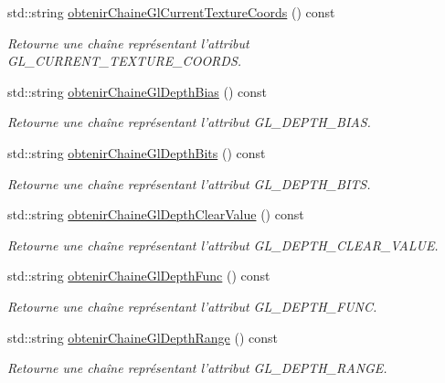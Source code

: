 \begin{DoxyCompactItemize}
std\-::string \hyperlink{group__utilitaire_ga5bf6abadfe9d63e576d34c94c93ee8f0}{obtenir\-Chaine\-Gl\-Current\-Texture\-Coords} () const 
\begin{DoxyCompactList}\small\item\em Retourne une chaîne représentant l'attribut G\-L\-\_\-\-C\-U\-R\-R\-E\-N\-T\-\_\-\-T\-E\-X\-T\-U\-R\-E\-\_\-\-C\-O\-O\-R\-D\-S. \end{DoxyCompactList}\item 
std\-::string \hyperlink{group__utilitaire_gae3e587b7e9f860f3874823a3c4ab7d71}{obtenir\-Chaine\-Gl\-Depth\-Bias} () const 
\begin{DoxyCompactList}\small\item\em Retourne une chaîne représentant l'attribut G\-L\-\_\-\-D\-E\-P\-T\-H\-\_\-\-B\-I\-A\-S. \end{DoxyCompactList}\item 
std\-::string \hyperlink{group__utilitaire_gae1dffc44c8e27d7cb249064cfe35653e}{obtenir\-Chaine\-Gl\-Depth\-Bits} () const 
\begin{DoxyCompactList}\small\item\em Retourne une chaîne représentant l'attribut G\-L\-\_\-\-D\-E\-P\-T\-H\-\_\-\-B\-I\-T\-S. \end{DoxyCompactList}\item 
std\-::string \hyperlink{group__utilitaire_gad8b3e2701fb07b0178b5015868818509}{obtenir\-Chaine\-Gl\-Depth\-Clear\-Value} () const 
\begin{DoxyCompactList}\small\item\em Retourne une chaîne représentant l'attribut G\-L\-\_\-\-D\-E\-P\-T\-H\-\_\-\-C\-L\-E\-A\-R\-\_\-\-V\-A\-L\-U\-E. \end{DoxyCompactList}\item 
std\-::string \hyperlink{group__utilitaire_gac0dff9e4aee8f969fe6e688bb407dcc9}{obtenir\-Chaine\-Gl\-Depth\-Func} () const 
\begin{DoxyCompactList}\small\item\em Retourne une chaîne représentant l'attribut G\-L\-\_\-\-D\-E\-P\-T\-H\-\_\-\-F\-U\-N\-C. \end{DoxyCompactList}\item 
std\-::string \hyperlink{group__utilitaire_ga9921b541644f4dc3b64a4ffd4a661a09}{obtenir\-Chaine\-Gl\-Depth\-Range} () const 
\begin{DoxyCompactList}\small\item\em Retourne une chaîne représentant l'attribut G\-L\-\_\-\-D\-E\-P\-T\-H\-\_\-\-R\-A\-N\-G\-E. \end{DoxyCompactList}\item 

\end{DoxyCompactItemize}
